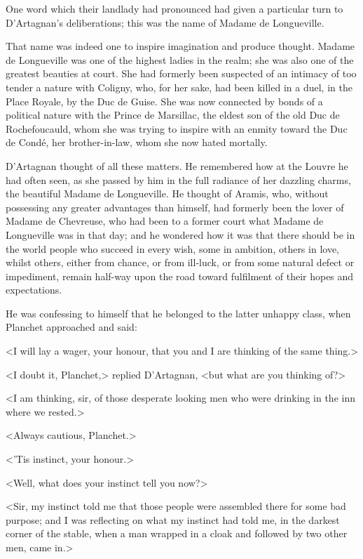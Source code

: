 One word which their landlady had pronounced had given a particular turn to D'Artagnan's deliberations; this was the name of Madame de Longueville.

That name was indeed one to inspire imagination and produce thought. Madame de Longueville was one of the highest ladies in the realm; she was also one of the greatest beauties at court. She had formerly been suspected of an intimacy of too tender a nature with Coligny, who, for her sake, had been killed in a duel, in the Place Royale, by the Duc de Guise. She was now connected by bonds of a political nature with the Prince de Marsillac, the eldest son of the old Duc de Rochefoucauld, whom she was trying to inspire with an enmity toward the Duc de Condé, her brother-in-law, whom she now hated mortally.

D'Artagnan thought of all these matters. He remembered how at the Louvre he had often seen, as she passed by him in the full radiance of her dazzling charms, the beautiful Madame de Longueville. He thought of Aramis, who, without possessing any greater advantages than himself, had formerly been the lover of Madame de Chevreuse, who had been to a former court what Madame de Longueville was in that day; and he wondered how it was that there should be in the world people who succeed in every wish, some in ambition, others in love, whilst others, either from chance, or from ill-luck, or from some natural defect or impediment, remain half-way upon the road toward fulfilment of their hopes and expectations.

He was confessing to himself that he belonged to the latter unhappy class, when Planchet approached and said:

<I will lay a wager, your honour, that you and I are thinking of the same thing.>

<I doubt it, Planchet,> replied D'Artagnan, <but what are you thinking of?>

<I am thinking, sir, of those desperate looking men who were drinking in the inn where we rested.>

<Always cautious, Planchet.>

<'Tis instinct, your honour.>

<Well, what does your instinct tell you now?>

<Sir, my instinct told me that those people were assembled there for some bad purpose; and I was reflecting on what my instinct had told me, in the darkest corner of the stable, when a man wrapped in a cloak and followed by two other men, came in.>

